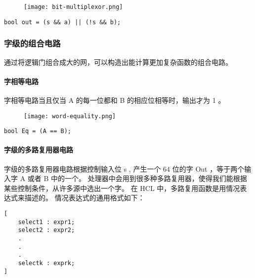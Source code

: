 \begin{figure}[H]
    \centering
    \texttt{[image: bit-multiplexor.png]}
\end{figure}
\begin{lstlisting}[style=CStyle]
bool out = (s && a) || (!s && b);
\end{lstlisting}

\subsubsection{字级的组合电路}

通过将逻辑门组合成大的网，可以构造出能计算更加复杂函数的组合电路。

\paragraph{字相等电路}

字相等电路当且仅当 A 的每一位都和 B 的相应位相等时，输出才为 1 。

\begin{figure}[H]
    \centering
    \texttt{[image: word-equality.png]}
\end{figure}
\begin{lstlisting}[style=CStyle]
bool Eq = (A == B);
\end{lstlisting}

\paragraph{字级的多路复用器电路}

字级的多路复用器电路根据控制输入位 s , 产生一个 64 位的字 Out ，等于两个输入字 A 或者 B 中的一个。
处理器中会用到很多种多路复用器，使得我们能根据某些控制条件，从许多源中选出一个字。
在 HCL 中，多路复用函数是用情况表达式来描述的。
情况表达式的通用格式如下：
\begin{lstlisting}[style=CStyle]
[
    select1 : expr1;
    select2 : expr2;
    .
    .
    .
    selectk : exprk;
]
\end{lstlisting}

